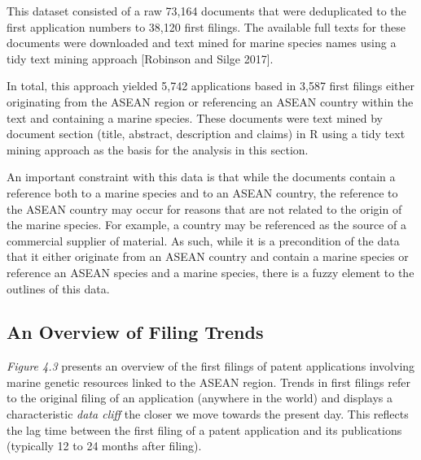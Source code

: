 \documentclass[]{book}
\theoremstyle{definition}
\theoremstyle{definition}
\theoremstyle{definition}
\theoremstyle{remark}
\begin{document}
This dataset consisted of a raw 73,164 documents that were deduplicated
to the first application numbers to 38,120 first filings. The available
full texts for these documents were downloaded and text mined for marine
species names using a tidy text mining approach {[}Robinson and Silge
2017{]}.

In total, this approach yielded 5,742 applications based in 3,587 first
filings either originating from the ASEAN region or referencing an ASEAN
country within the text and containing a marine species. These documents
were text mined by document section (title, abstract, description and
claims) in R using a tidy text mining approach as the basis for the
analysis in this section.

An important constraint with this data is that while the documents
contain a reference both to a marine species and to an ASEAN country,
the reference to the ASEAN country may occur for reasons that are not
related to the origin of the marine species. For example, a country may
be referenced as the source of a commercial supplier of material. As
such, while it is a precondition of the data that it either originate
from an ASEAN country and contain a marine species or reference an ASEAN
species and a marine species, there is a fuzzy element to the outlines
of this data.

\hypertarget{an-overview-of-filing-trends}{%
\subsection{An Overview of Filing
Trends}\label{an-overview-of-filing-trends}}

\emph{Figure 4.3} presents an overview of the first filings of patent
applications involving marine genetic resources linked to the ASEAN
region. Trends in first filings refer to the original filing of an
application (anywhere in the world) and displays a characteristic
\emph{data cliff} the closer we move towards the present day. This
reflects the lag time between the first filing of a patent application
and its publications (typically 12 to 24 months after filing).
\end{document}
